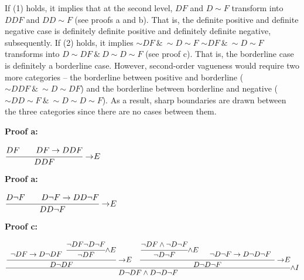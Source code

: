If (1) holds, it implies that at the second level, $DF$ and
$D{\sim}F$ transform into $DDF$ and $DD{\sim}F$ (see proofs a and
b). That is, the definite positive and definite negative case is
definitely definite positive and definitely definite negative,
subsequently. If (2) holds, it implies ${\sim}DF\ \&\  {\sim}D {\sim}F$
${\sim}DF \ \& \ {\sim}D{\sim}F$ transforms into $D{\sim}DF \ \& \ D{\sim}D{\sim}F$ (see proof c). That is,
the borderline case is definitely a borderline case. However,
second-order vagueness would require two more categories -- the
borderline between positive and borderline
(${\sim}DDF \ \& \ {\sim}D{\sim}DF$) and the borderline between borderline
and negative (${\sim}DD{\sim}F \ \& \ {\sim}D{\sim}D{\sim}F$). As a result,
sharp boundaries are drawn between the three categories since there are
no cases between them.


\bigskip
\noindent
\begin{minipage}[t]{0.48\textwidth}
    \noindent \textbf{Proof a:} \\
    \begin{center}
    $\cfrac{
        DF \hspace{2em} DF \rightarrow DDF
    }{DDF} {\ \rightarrow \hspace{-0.25em} E}$
    \end{center}
\end{minipage}
\begin{minipage}[t]{0.48\textwidth}
  \noindent \textbf{Proof a:} \\
    \begin{center}
    $\cfrac{
        D \neg F \hspace{2em} D\neg F \rightarrow DD \neg F
    }{DD\neg F} {\ \rightarrow \hspace{-0.25em} E}$
    \end{center}
  \end{minipage}
\bigskip

\noindent \textbf{Proof c:}
  \begin{center}
    $\cfrac{
        \cfrac{
        \begin{array}{c}
        \\
        \neg DF \rightarrow D \neg DF
        \end{array}
        \cfrac{
            \neg DF \neg D \neg F
        }{\neg DF} {\land E}
        }{D \neg DF} {\ \rightarrow \hspace{-0.25em}E} \hspace{1em}
        \cfrac{
            \cfrac{\neg DF \land \neg D \neg F}{\neg D \neg F} {\land E} \hspace{1em}
            \begin{array}{c}
            \\
            \neg D \neg F \rightarrow D \neg D \neg F
            \end{array}
        }{D \neg D \neg F}{\ \rightarrow \hspace{-0.25em}E}
    }{D\neg D F \land D\neg D\neg F} {\land I}$
    \end{center}

